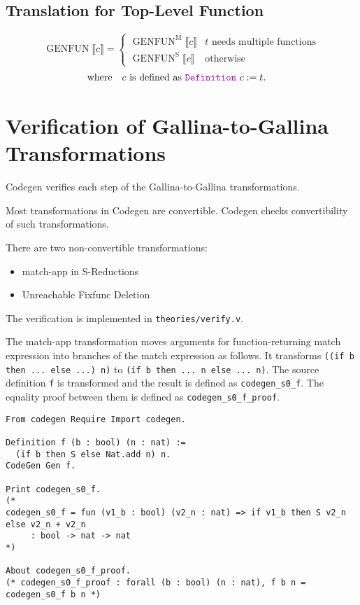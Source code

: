 \documentclass[a4paper,fleqn]{article}
\def\gallina{\textrm{Gallina}}
\def\codegen{\textrm{Codegen}}
\newcommand{\kwDefinition}{\mbox{\color{myviolet}\ttfamily Definition}}
\newcommand{\BRA}[1]{\llbracket #1 \rrbracket}
\DeclareMathOperator{\genfunop}{GENFUN}
\newcommand{\genfun}[1]{\genfunop\BRA{#1}}
\newcommand{\genfuns}[1]{\genfunop^\mathrm{S}\BRA{#1}}
\newcommand{\genfunm}[1]{\genfunop^\mathrm{M}\BRA{#1}}
\begin{document}
\subsection{Translation for Top-Level Function}\label{sec:genfun}
\[
  \genfun{c} =
  \begin{cases}
    \genfunm{c} & \text{$t$ needs multiple functions} \\
    \genfuns{c} & \text{otherwise}
  \end{cases}
\]
\[ \text{where} \quad
  \begin{aligned}[t]
    & \text{$c$ is defined as \kwDefinition~$c := t.$}
  \end{aligned}
\]

\section{Verification of \gallina-to-\gallina{} Transformations}\label{sec:verification-of-gallina-to-gallina-transformations}

\codegen{} verifies each step of the \gallina-to-\gallina{} transformations.

Most transformations in \codegen{} are convertible.
\codegen{} checks convertibility of such transformations.

There are two non-convertible transformations:

\begin{itemize}
  \item match-app in S-Reductions
  \item Unreachable Fixfunc Deletion
\end{itemize}

The verification is implemented in \verb!theories/verify.v!.

The match-app transformation moves arguments for function-returning match expression into
branches of the match expression as follows.
It transforms \lstinline!((if b then ... else ...) n)! to \lstinline!(if b then ... n else ... n)!.
The source definition \lstinline!f! is transformed and the result is defined as \lstinline!codegen_s0_f!.
The equality proof between them is defined as \lstinline!codegen_s0_f_proof!.

\begin{lstlisting}
From codegen Require Import codegen.

Definition f (b : bool) (n : nat) :=
  (if b then S else Nat.add n) n.
CodeGen Gen f.

Print codegen_s0_f.
(*
codegen_s0_f = fun (v1_b : bool) (v2_n : nat) => if v1_b then S v2_n else v2_n + v2_n
     : bool -> nat -> nat
*)

About codegen_s0_f_proof.
(* codegen_s0_f_proof : forall (b : bool) (n : nat), f b n = codegen_s0_f b n *)
\end{lstlisting}
\end{document}
